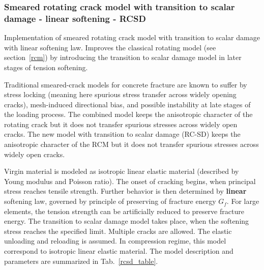\documentclass[a4paper]{article}
\begin{document}
\subsubsection{Smeared rotating crack model with transition to scalar
damage - linear softening - RCSD}
\label{rcsd}
Implementation of smeared rotating crack model with transition to
scalar damage with linear softening law.
Improves the classical rotating model (see
section~\ref{rcm}) by introducing the transition to scalar damage
model in  later stages of tension softening.

Traditional smeared-crack models for concrete fracture are known to suffer by stress locking (meaning here spurious stress transfer across widely opening cracks),
mesh-induced directional bias, and possible instability at late stages of the loading process.
The combined model keeps the anisotropic character of the rotating
crack but it does not transfer spurious stresses across
widely open cracks.
The new model with transition to
scalar damage (RC-SD) keeps the anisotropic character of the RCM but
it does not transfer spurious stresses across widely open cracks.

Virgin material is modeled as isotropic linear elastic material
(described by Young modulus and Poisson
ratio). The onset of cracking begins, when principal stress reaches
tensile strength.
Further behavior is then determined by {\bf linear} softening law,
governed by principle of preserving of fracture
energy $G_f$. For large elements, the tension strength can be
artificially reduced
to preserve fracture energy.  The transition to scalar damage model
takes place, when the softening stress reaches the specified limit.
Multiple cracks are allowed.
The elastic unloading and reloading is assumed.
In compression regime, this model correspond to isotropic linear elastic material.
The model description and parameters are summarized
in Tab.~\ref{rcsd_table}.
\end{document}
